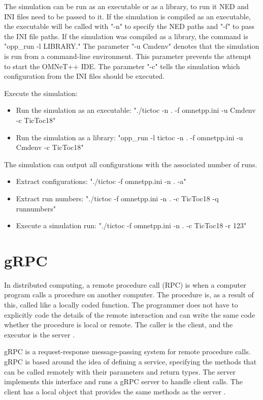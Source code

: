 The simulation can be run as an executable or as a library, to run it NED and INI files need to be passed to it. If the simulation is compiled as an executable, the executable will be called with "-n" to specify the NED paths and "-f" to pass the INI file paths. If the simulation was compiled as a library, the command is "opp\_run -l LIBRARY." The parameter "-u Cmdenv" denotes that the simulation is run from a command-line environment. This parameter prevents the attempt to start the OMNeT++ IDE. The parameter "-c" tells the simulation which configuration from the INI files should be executed.

Execute the simulation:
\begin{itemize}
  \item Run the simulation as an executable: "./tictoc -n . -f omnetpp.ini -u Cmdenv -c TicToc18"
  \item Run the simulation as a library: "opp\_run -l tictoc -n . -f omnetpp.ini -u Cmdenv -c TicToc18"
\end{itemize}

The simulation can output all configurations with the associated number of runs.
\begin{itemize}
  \item Extract configurations: "./tictoc -f omnetpp.ini -n . -a"
  \item Extract run numbers: "./tictoc -f omnetpp.ini -n . -c TicToc18 -q runnumbers"
  \item Execute a simulation run: "./tictoc -f omnetpp.ini -n . -c TicToc18 -r 123"
\end{itemize}

\section{gRPC}

In distributed computing, a remote procedure call (RPC) is when a computer program calls a procedure on another computer. The procedure is, as a result of this, called like a locally coded function. The programmer does not have to explicitly code the details of the remote interaction and can write the same code whether the procedure is local or remote. The caller is the client, and the executor is the server \cite{wiki:Remote_procedure_call}.

gRPC is a request-response message-passing system for remote procedure calls. gRPC is based around the idea of defining a service, specifying the methods that can be called remotely with their parameters and return types. The server implements this interface and runs a gRPC server to handle client calls. The client has a local object that provides the same methods as the server \cite{grpc:introduction}.

